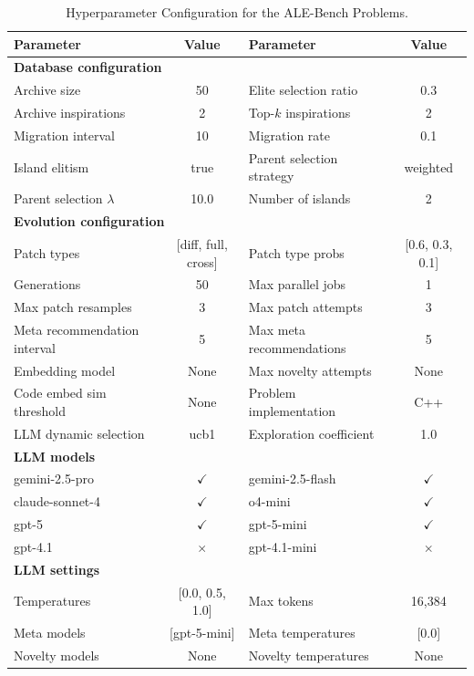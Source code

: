 \begin{table}[h]
\centering
\small
\begin{tabular}{lclc}
\toprule
\textbf{Parameter} & \textbf{Value} & \textbf{Parameter} & \textbf{Value} \\
\midrule
\multicolumn{4}{l}{\textbf{Database configuration}} \\
\midrule
Archive size & 50 & Elite selection ratio & 0.3 \\
Archive inspirations & 2 & Top-$k$ inspirations & 2 \\
Migration interval & 10 & Migration rate & 0.1 \\
Island elitism & true & Parent selection strategy & weighted \\
Parent selection $\lambda$ & 10.0 & Number of islands & 2 \\
\midrule
\multicolumn{4}{l}{\textbf{Evolution configuration}} \\
\midrule
Patch types & [diff, full, cross] & Patch type probs & [0.6, 0.3, 0.1] \\
Generations & 50 & Max parallel jobs & 1 \\
Max patch resamples & 3 & Max patch attempts & 3 \\
Meta recommendation interval & 5 & Max meta recommendations & 5 \\
Embedding model & None & Max novelty attempts & None \\
Code embed sim threshold & None & Problem implementation & C++ \\
LLM dynamic selection & ucb1 & Exploration coefficient & 1.0 \\
\midrule
\multicolumn{4}{l}{\textbf{LLM models}} \\
\midrule
gemini-2.5-pro & $\checkmark$ & gemini-2.5-flash & $\checkmark$ \\
claude-sonnet-4 & $\checkmark$ & o4-mini & $\checkmark$ \\
gpt-5 & $\checkmark$ & gpt-5-mini & $\checkmark$ \\
gpt-4.1 & $\times$ & gpt-4.1-mini & $\times$ \\
\midrule
\multicolumn{4}{l}{\textbf{LLM settings}} \\
\midrule
Temperatures & [0.0, 0.5, 1.0] & Max tokens & 16{,}384 \\
Meta models & [gpt-5-mini] & Meta temperatures & [0.0] \\
Novelty models & None & Novelty temperatures & None \\
\bottomrule
\end{tabular}
  \caption{\ouralgo Hyperparameter Configuration for the ALE-Bench Problems.}
  \label{tab:hyperparams_ale}
\end{table}

